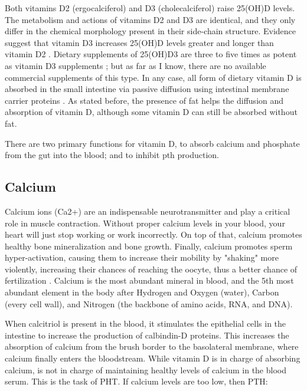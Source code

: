 Both vitamins D2 (ergocalciferol) and D3 (cholecalciferol) raise 25(OH)D levels. The metabolism and actions of vitamins D2 and D3 are identical, and they only differ in the chemical morphology present in their side-chain structure. Evidence suggest that vitamin D3 increases 25(OH)D levels greater and longer than vitamin D2 \cite{ref:Tripkovic2012, ref:Lehmann2013, ref:Logan2012, ref:Tripkovic2017}. Dietary supplements of 25(OH)D3 are three to five times as potent as vitamin D3 supplements \cite{ref:GraeffArmas2019, ref:QuesadaGomez2018}; but as far as I know, there are no available commercial supplements of this type. In any case, all form of dietary vitamin D is absorbed in the small intestine via passive diffusion using intestinal membrane carrier proteins \cite{ref:Silva2017}. As stated before, the presence of fat helps the diffusion and absorption of vitamin D, although some vitamin D can still be absorbed without fat.

There are two primary functions for vitamin D, to absorb calcium and phosphate from the gut into the blood; and to inhibit \gls{pth} production.

\subsection{Calcium}
\label{vd:calcium}

Calcium ions (Ca2+) are an indispensable neurotransmitter and play a critical role in muscle contraction. Without proper calcium levels in your blood, your heart will just stop working or work incorrectly. On top of that, calcium promotes healthy bone mineralization and bone growth. Finally, calcium promotes sperm hyper-activation, causing them to increase their mobility by "shaking" more violently, increasing their chances of reaching the oocyte, thus a better chance of fertilization \cite{ref:1_Institute_of_Medicine2011-zg, Limongi2017, ref:3_680f7627099e40be878db46152ebe484}. Calcium is the most abundant mineral in blood, and the 5th most abundant element in the body after Hydrogen and Oxygen (water), Carbon (every cell wall), and Nitrogen (the backbone of amino acids, RNA, and DNA).

When calcitriol is present in the blood, it stimulates the epithelial cells in the intestine to increase the production of calbindin-D proteins. This increases the absorption of calcium from the brush border to the basolateral membrane, where calcium finally enters the bloodstream. While vitamin D is in charge of absorbing calcium, is not in charge of maintaining healthy levels of calcium in the blood serum. This is the task of PHT. If calcium levels are too low, then PTH:

